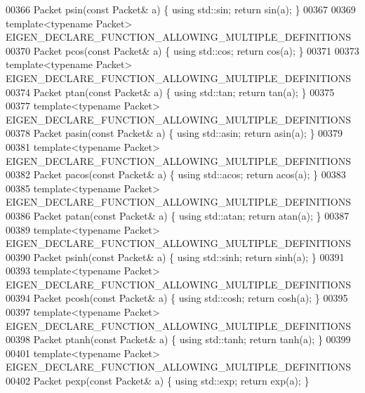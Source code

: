 \begin{DoxyCode}
{{00366 Packet psin(\textcolor{keyword}{const} Packet& a) \{ \textcolor{keyword}{using} std::sin; \textcolor{keywordflow}{return} sin(a); \}
00367 
00369 \textcolor{keyword}{template}<\textcolor{keyword}{typename} Packet> EIGEN\_DECLARE\_FUNCTION\_ALLOWING\_MULTIPLE\_DEFINITIONS
00370 Packet pcos(\textcolor{keyword}{const} Packet& a) \{ \textcolor{keyword}{using} std::cos; \textcolor{keywordflow}{return} cos(a); \}
00371 
00373 \textcolor{keyword}{template}<\textcolor{keyword}{typename} Packet> EIGEN\_DECLARE\_FUNCTION\_ALLOWING\_MULTIPLE\_DEFINITIONS
00374 Packet ptan(\textcolor{keyword}{const} Packet& a) \{ \textcolor{keyword}{using} std::tan; \textcolor{keywordflow}{return} tan(a); \}
00375 
00377 \textcolor{keyword}{template}<\textcolor{keyword}{typename} Packet> EIGEN\_DECLARE\_FUNCTION\_ALLOWING\_MULTIPLE\_DEFINITIONS
00378 Packet pasin(\textcolor{keyword}{const} Packet& a) \{ \textcolor{keyword}{using} std::asin; \textcolor{keywordflow}{return} asin(a); \}
00379 
00381 \textcolor{keyword}{template}<\textcolor{keyword}{typename} Packet> EIGEN\_DECLARE\_FUNCTION\_ALLOWING\_MULTIPLE\_DEFINITIONS
00382 Packet pacos(\textcolor{keyword}{const} Packet& a) \{ \textcolor{keyword}{using} std::acos; \textcolor{keywordflow}{return} acos(a); \}
00383 
00385 \textcolor{keyword}{template}<\textcolor{keyword}{typename} Packet> EIGEN\_DECLARE\_FUNCTION\_ALLOWING\_MULTIPLE\_DEFINITIONS
00386 Packet patan(\textcolor{keyword}{const} Packet& a) \{ \textcolor{keyword}{using} std::atan; \textcolor{keywordflow}{return} atan(a); \}
00387 
00389 \textcolor{keyword}{template}<\textcolor{keyword}{typename} Packet> EIGEN\_DECLARE\_FUNCTION\_ALLOWING\_MULTIPLE\_DEFINITIONS
00390 Packet psinh(\textcolor{keyword}{const} Packet& a) \{ \textcolor{keyword}{using} std::sinh; \textcolor{keywordflow}{return} sinh(a); \}
00391 
00393 \textcolor{keyword}{template}<\textcolor{keyword}{typename} Packet> EIGEN\_DECLARE\_FUNCTION\_ALLOWING\_MULTIPLE\_DEFINITIONS
00394 Packet pcosh(\textcolor{keyword}{const} Packet& a) \{ \textcolor{keyword}{using} std::cosh; \textcolor{keywordflow}{return} cosh(a); \}
00395 
00397 \textcolor{keyword}{template}<\textcolor{keyword}{typename} Packet> EIGEN\_DECLARE\_FUNCTION\_ALLOWING\_MULTIPLE\_DEFINITIONS
00398 Packet ptanh(\textcolor{keyword}{const} Packet& a) \{ \textcolor{keyword}{using} std::tanh; \textcolor{keywordflow}{return} tanh(a); \}
00399 
00401 \textcolor{keyword}{template}<\textcolor{keyword}{typename} Packet> EIGEN\_DECLARE\_FUNCTION\_ALLOWING\_MULTIPLE\_DEFINITIONS
00402 Packet pexp(\textcolor{keyword}{const} Packet& a) \{ \textcolor{keyword}{using} std::exp; \textcolor{keywordflow}{return} exp(a); \}
}}
\end{DoxyCode}

